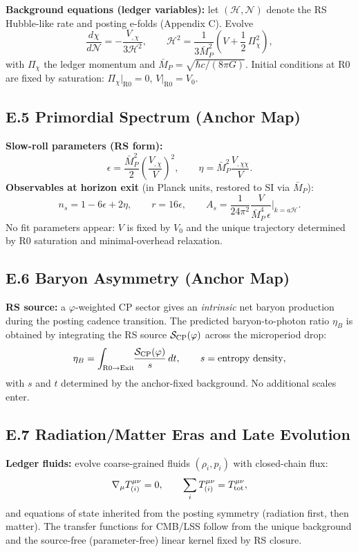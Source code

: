 \documentclass[11pt]{article}
\theoremstyle{definition}
\theoremstyle{remark}
\begin{document}
\noindent
\textbf{Background equations (ledger variables):} let \((\mathcal{H},\mathcal{N})\) denote the RS Hubble-like rate and posting e-folds (Appendix C). Evolve
\[
\frac{d\chi}{d\mathcal{N}}=-\frac{V_{,\chi}}{3\mathcal{H}^2},\qquad 
\mathcal{H}^2=\frac{1}{3\bar M_P^2}\left(V+\frac12\,\Pi_\chi^2\right),
\]
with \(\Pi_\chi\) the ledger momentum and \(\bar M_P=\sqrt{\hbar c/(8\pi G)}\). Initial conditions at R0 are fixed by saturation: \(\Pi_\chi|_{\mathrm{R0}}=0\), \(V|_{\mathrm{R0}}=V_0\).

\subsection*{E.5 Primordial Spectrum (Anchor Map)}

\noindent
\textbf{Slow-roll parameters (RS form):}
\[
\epsilon=\frac{\bar M_P^2}{2}\left(\frac{V_{,\chi}}{V}\right)^2,\qquad 
\eta=\bar M_P^2\frac{V_{,\chi\chi}}{V}.
\]
\textbf{Observables at horizon exit} (in Planck units, restored to SI via \(\bar M_P\)):
\[
n_s=1-6\epsilon+2\eta,\qquad r=16\epsilon,\qquad 
A_s=\frac{1}{24\pi^2}\frac{V}{\bar M_P^4\,\epsilon}\Bigg|_{k=a\mathcal{H}}.
\]
No fit parameters appear: \(V\) is fixed by \(V_0\) and the unique trajectory determined by R0 saturation and minimal-overhead relaxation.

\subsection*{E.6 Baryon Asymmetry (Anchor Map)}

\noindent
\textbf{RS source:} a \(\varphi\)-weighted CP sector gives an \emph{intrinsic} net baryon production during the posting cadence transition. The predicted baryon-to-photon ratio \(\eta_B\) is obtained by integrating the RS source \(\mathcal{S}_{\rm CP}(\varphi)\) across the microperiod drop:
\[
\eta_B = \int_{\text{R0}\to\text{Exit}}\!\!\frac{\mathcal{S}_{\rm CP}(\varphi)}{s}\,d t,\qquad s=\text{entropy density},
\]
with \(s\) and \(t\) determined by the anchor-fixed background. No additional scales enter.

\subsection*{E.7 Radiation/Matter Eras and Late Evolution}

\noindent
\textbf{Ledger fluids:} evolve coarse-grained fluids \((\rho_i,p_i)\) with closed-chain flux:
\[
\nabla_\mu T^{\mu\nu}_{(i)}=0,\qquad \sum_i T^{\mu\nu}_{(i)} = T^{\mu\nu}_{\rm tot},
\]
and equations of state inherited from the posting symmetry (radiation first, then matter). The transfer functions for CMB/LSS follow from the unique background and the source-free (parameter-free) linear kernel fixed by RS closure.
\end{document}
